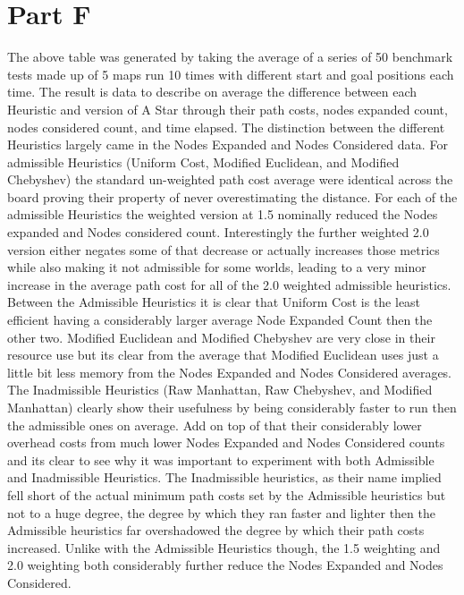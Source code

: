 \documentclass[12pt]{article}
\begin{document}
\section{Part F}
The above table was generated by taking the average of a series of 50 benchmark tests made up of 5 maps run 10 times with different start and goal positions each time. The result is data to describe on average the difference between each Heuristic and version of A Star through their path costs, nodes expanded count, nodes considered count, and time elapsed.
\newline
\newline
The distinction between the different Heuristics largely came in the Nodes Expanded and Nodes Considered data. For admissible Heuristics (Uniform Cost, Modified Euclidean, and Modified Chebyshev) the standard un-weighted path cost average were identical across the board proving their property of never overestimating the distance. For each of the admissible Heuristics the weighted version at 1.5 nominally reduced the Nodes expanded and Nodes considered count. Interestingly the further weighted 2.0 version either negates some of that decrease or actually increases those metrics while also making it not admissible for some worlds, leading to a very minor increase in the average path cost for all of the 2.0 weighted admissible heuristics. 
\newline
\newline
Between the Admissible Heuristics it is clear that Uniform Cost is the least efficient having a considerably larger average Node Expanded Count then the other two. Modified Euclidean and Modified Chebyshev are very close in their resource use but its clear from the average that Modified Euclidean uses just a little bit less memory from the Nodes Expanded and Nodes Considered averages.
\newline
\newline
The Inadmissible Heuristics (Raw Manhattan, Raw Chebyshev, and Modified Manhattan) clearly show their usefulness by being considerably faster to run then the admissible ones on average. Add on top of that their considerably lower overhead costs from much lower Nodes Expanded and Nodes Considered counts and its clear to see why it was important to experiment with both Admissible and Inadmissible Heuristics. The Inadmissible heuristics, as their name implied fell short of the actual minimum path costs set by the Admissible heuristics but not to a huge degree, the degree by which they ran faster and lighter then the Admissible heuristics far overshadowed the degree by which their path costs increased. Unlike with the Admissible Heuristics though, the 1.5 weighting and 2.0 weighting both considerably further reduce the Nodes Expanded and Nodes Considered.
\end{document}
